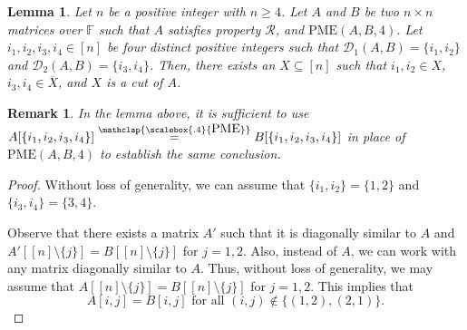 \documentclass[11pt,letterpaper]{article}
\newcommand{\comp}[1]{\overline{#1}}
\newcommand{\F}{\mathbb{F}}
\newtheorem{lemma}{Lemma}[section]
\newtheorem{remark}{Remark}[section]
\newcommand{\PME}{\stackrel{\mathclap{\scalebox{.4}{\mbox{PME}}}}{=}}
\newcommand{\kPME}[3]{\mathrm{PME}(#1, #2, #3)}
\newcommand{\nsubset}[1]{[n]\setminus\{#1\}}
\newcommand{\calD}{\mathcal{D}}
\newcommand{\prop}{\mathcal{R}}
\begin{document}
{{{\begin{lemma}
\label{lem:small-matrices-DE-to-cut-4}
Let $n$ be a positive integer with $n\geq 4$. Let $A$ and $B$ be two $n\times n$ matrices over $\F$ such that $A$ satisfies property $\prop$, and $\kPME{A}{B}{4}$. Let $i_1, i_2, i_3, i_4\in[n]$ be four distinct positive integers such that $\calD_1(A,B)=\{i_1, i_2\}$ and $\calD_2(A,B)=\{i_3, i_4\}$. Then, there exists an $X\subseteq [n]$ such that $i_1, i_2\in X$, $i_3, i_4\in\comp{X}$, and $X$ is a cut of $A$.
\end{lemma}

\begin{remark}
In the lemma above, it is sufficient to use $A[\{i_1, i_2, i_3, i_4\}]\PME B[\{i_1, i_2, i_3, i_4\}]$ in place of $\kPME{A}{B}{4}$ to establish the same conclusion. 
\end{remark}

\begin{proof}
Without loss of generality, we can assume that $\{i_1, i_2\}=\{1,2\}$ and $\{i_3, i_4\}=\{3, 4\}$. 

Observe that there exists a matrix $A'$ such that it is diagonally similar to $A$ and $A'[\nsubset{j}]=B[\nsubset{j}]$ for $j=1,2$. Also, instead of $A$, we can work with any matrix diagonally similar to $A$. Thus, without loss of generality, we may assume that $A[\nsubset{j}]=B[\nsubset{j}]$ for $j=1,2$. This implies that 
\begin{equation}
\label{eqn:small-matrices-DE-to-cut-4-one}
A[i,j]=B[i,j] \text{ for all } (i,j)\notin\{(1,2), (2,1)\}.
\end{equation}




\end{proof}}}}
\end{document}
